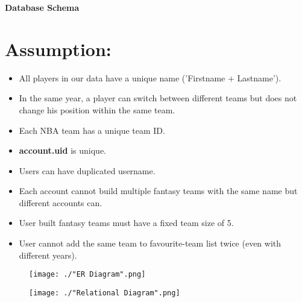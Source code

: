 \documentclass[11pt]{article}
\begin{document}
\begin{center}
{\LARGE\bf Database Schema}
\end{center}

\section*{Assumption:}

\begin{itemize}
	\item All players in our data have a unique name ('Firstname + Lastname').
	\item In the same year, a player can switch between different teams but does not change his position within the same team.
	\item Each NBA team has a unique team ID.
	\item {\bf account.uid} is unique.
	\item Users can have duplicated username.
	\item Each account cannot build multiple fantasy teams with the same name but different accounts can.
	\item User built fantasy teams must have a fixed team size of 5.
	\item User cannot add the same team to favourite-team list twice (even with different years).
\end{itemize}

\newpage

\begin{figure} 
  \texttt{[image: ./"ER Diagram".png]}
\end{figure}
\newpage

\begin{figure} 
  \texttt{[image: ./"Relational Diagram".png]}
\end{figure}
\end{document}

